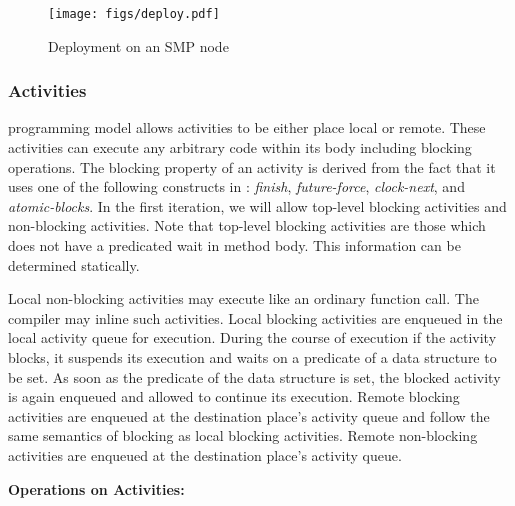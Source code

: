 \begin{figure}
\center
\texttt{[image: figs/deploy.pdf]}
\caption{\Xten{} Deployment on an SMP node}
\label{fig:deploy1}
\end{figure}

\subsubsection{Activities}
\Xten{} programming model allows activities to be either place local or
remote.  These activities can execute any arbitrary code within its body
including blocking operations. The blocking property of an activity is
derived from the fact that it uses one of the following \Xten{}
constructs in : {\it finish}, {\it future-force}, {\it clock-next}, and
{\it atomic-blocks}. In the first iteration, we will allow top-level
blocking activities  and non-blocking activities. Note that top-level
blocking activities are those which does not have a predicated wait in
method body. This information can be determined statically.

Local non-blocking activities may execute like an ordinary function
call.  The compiler may inline such activities.  Local blocking
activities are enqueued in the local activity queue for execution.
During the course of execution if the activity blocks, it suspends its
execution and waits on a predicate of a data structure to be set. As
soon as the predicate of the data structure is set, the blocked activity
is again enqueued and allowed to continue its execution. Remote blocking
activities are enqueued at the destination place's activity queue and
follow the same semantics of blocking as local blocking activities.
Remote non-blocking activities are enqueued at the destination place's
activity queue.


{\bf Operations on Activities:}


